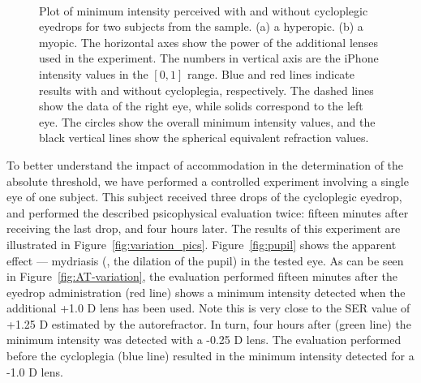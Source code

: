 \begin{figure}[!thb]
	\centering
	~
	\caption[Plot of minimum intensity perceived with and without cycloplegic eyedrops for two sub- jects from the sample]{Plot of minimum intensity perceived with and without cycloplegic eyedrops for two subjects from the sample. (a) a hyperopic. (b) a myopic.  The horizontal axes show the power of the additional lenses used in the experiment. The numbers in vertical axis are the iPhone intensity values in the $[0,1]$ range. 
	Blue and red lines indicate results with and without cycloplegia, respectively. 
	The dashed lines show the data of the right eye, while solids correspond to the left eye. The circles show the overall minimum intensity values, and the black vertical lines show the spherical equivalent refraction values.}
	\label{fig:hyperopic_myopic}
\end{figure}

To better understand the impact of accommodation in the determination of the absolute threshold, we have performed a controlled experiment involving a single eye of one subject. This subject received three drops of the cycloplegic eyedrop, and performed the described psicophysical evaluation twice: fifteen minutes after receiving the last drop, and four hours later. The results of this experiment are illustrated in Figure~\ref{fig:variation_pics}. Figure~\ref{fig:pupil} shows the apparent effect --- mydriasis (\ie, the dilation of the pupil) in the tested eye. As can be seen in Figure~\ref{fig:AT-variation}, the evaluation performed fifteen minutes after the eyedrop administration (red line) shows a minimum intensity detected when the additional +1.0 D lens has been used. Note this is very close to the SER value of +1.25 D estimated by the autorefractor. In turn, four hours after (green line) the minimum intensity was detected with a -0.25 D lens. The evaluation performed before the cycloplegia (blue line) resulted in the minimum intensity detected for a -1.0 D lens.


